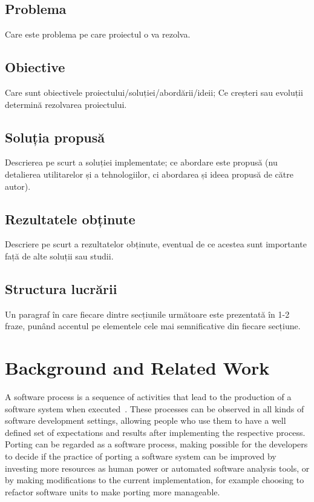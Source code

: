 \documentclass[12pt,a4paper]{report}
\begin{document}
\section{Problema}
Care este problema pe care proiectul o va rezolva.
\section{Obiective}
Care sunt obiectivele proiectului/soluției/abordării/ideii; Ce creșteri sau evoluții determină rezolvarea proiectului.
\section{Soluția propusă}
Descrierea pe scurt a soluției implementate; ce abordare este propusă (nu detalierea utilitarelor și a tehnologiilor, ci abordarea și ideea propusă de către autor).
\section{Rezultatele obținute}
Descriere pe scurt a rezultatelor obținute, eventual de ce acestea sunt importante față de alte soluții sau studii.
\section{Structura lucrării}
Un paragraf în care fiecare dintre secțiunile următoare este prezentată în 1-2 fraze, punând accentul pe elementele cele mai semnificative din fiecare secțiune.



\chapter{Background and Related Work}

A software process is a sequence of activities that lead to the production of a software system
when executed~\cite{humphrey1995discipline}. These processes can be observed in all kinds of
software development settings, allowing people who use them to have a well defined set of
expectations and results after implementing the respective process. Porting can be regarded as a
software process, making possible for the developers to decide if the practice of porting a software
system can be improved by investing more resources as human power or automated software analysis
tools, or by making modifications to the current implementation, for example choosing to refactor
software units to make porting more manageable.
\end{document}
